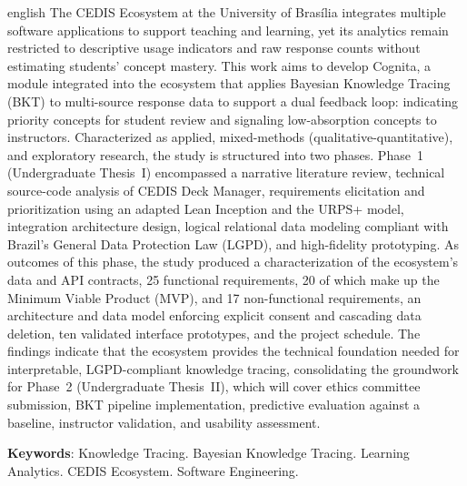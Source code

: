 
\begin{resumo}[Abstract]
 \begin{otherlanguage*}{english}
The CEDIS Ecosystem at the University of Brasília integrates multiple software applications to support teaching and learning, yet its analytics remain restricted to descriptive usage indicators and raw response counts without estimating students' concept mastery. This work aims to develop Cognita, a module integrated into the ecosystem that applies Bayesian Knowledge Tracing (BKT) to multi-source response data to support a dual feedback loop: indicating priority concepts for student review and signaling low-absorption concepts to instructors. Characterized as applied, mixed-methods (qualitative-quantitative), and exploratory research, the study is structured into two phases. Phase~1 (Undergraduate Thesis~I) encompassed a narrative literature review, technical source-code analysis of CEDIS Deck Manager, requirements elicitation and prioritization using an adapted Lean Inception and the URPS+ model, integration architecture design, logical relational data modeling compliant with Brazil's General Data Protection Law (LGPD), and high-fidelity prototyping. As outcomes of this phase, the study produced a characterization of the ecosystem's data and API contracts, 25 functional requirements, 20 of which make up the Minimum Viable Product (MVP), and 17 non-functional requirements, an architecture and data model enforcing explicit consent and cascading data deletion, ten validated interface prototypes, and the project schedule. The findings indicate that the ecosystem provides the technical foundation needed for interpretable, LGPD-compliant knowledge tracing, consolidating the groundwork for Phase~2 (Undergraduate Thesis~II), which will cover ethics committee submission, BKT pipeline implementation, predictive evaluation against a baseline, instructor validation, and usability assessment.

\vspace{\onelineskip}

\noindent\sloppy
\textbf{Keywords}: Knowledge Tracing. Bayesian Knowledge Tracing. Learning Analytics. CEDIS Ecosystem. Software Engineering.\par
 \end{otherlanguage*}
\end{resumo}
